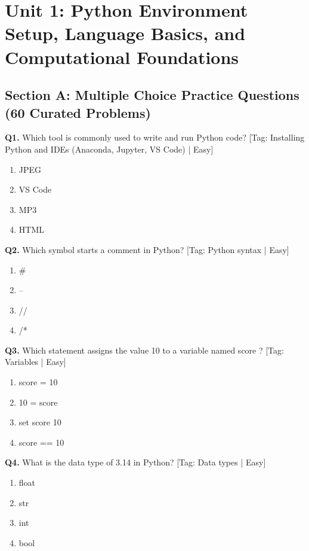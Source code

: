 \chapter{Unit 1: Python Environment Setup, Language Basics, and Computational Foundations}

\section{Section A: Multiple Choice Practice Questions (60 Curated Problems)}

\noindent\textbf{Q1.} Which tool is commonly used to write and run Python code? \hfill [Tag: Installing Python and IDEs (Anaconda, Jupyter, VS Code) | Easy]
\begin{enumerate}[label=(\alph*),topsep=2pt,itemsep=1pt,partopsep=0pt,parsep=0pt]
    \item {JPEG}
    \item {VS Code}
    \item {MP3}
    \item {HTML}
\end{enumerate}
\vspace{2mm}
\noindent\textbf{Q2.} Which symbol starts a comment in Python? \hfill [Tag: Python syntax | Easy]
\begin{enumerate}[label=(\alph*),topsep=2pt,itemsep=1pt,partopsep=0pt,parsep=0pt]
    \item {\#}
    \item {--}
    \item {//}
    \item {/*}
\end{enumerate}
\vspace{2mm}
\noindent\textbf{Q3.} Which statement assigns the value 10 to a variable named score ? \hfill [Tag: Variables | Easy]
\begin{enumerate}[label=(\alph*),topsep=2pt,itemsep=1pt,partopsep=0pt,parsep=0pt]
    \item {score = 10}
    \item {10 = score}
    \item {set score 10}
    \item {score == 10}
\end{enumerate}
\vspace{2mm}
\noindent\textbf{Q4.} What is the data type of 3.14 in Python? \hfill [Tag: Data types | Easy]
\begin{enumerate}[label=(\alph*),topsep=2pt,itemsep=1pt,partopsep=0pt,parsep=0pt]
    \item {float}
    \item {str}
    \item {int}
    \item {bool}
\end{enumerate}

